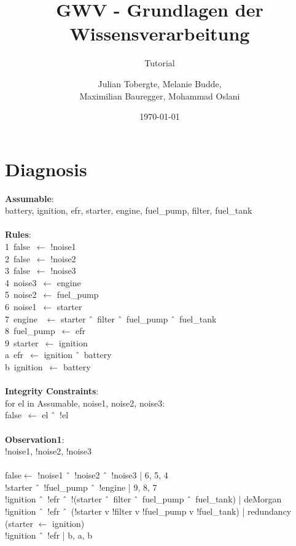 \documentclass[DIV=9,numbers=noenddot]{scrartcl}
\title{GWV - Grundlagen der Wissensverarbeitung}
\subtitle{Tutorial \arabic{blatt}}
\author{Julian Tobergte, Melanie Budde,\\Maximilian Bauregger, Mohammad Oslani}
\date{\today}
\begin{document}
	\maketitle
				
	\section{Diagnosis}	
	\textbf{Assumable}:\\
	battery, ignition, efr, starter, engine, fuel\_pump, filter, fuel\_tank\\\\
	\textbf{Rules}:\\
	1\ false\ $\leftarrow$ !noise1\\
	2\ false\ $\leftarrow$ !noise2\\
	3\ false\ $\leftarrow$ !noise3\\
	4\ noise3\ $\leftarrow$ engine\\
	5\ noise2\ $\leftarrow$ fuel\_pump\\
	6\ noise1\ $\leftarrow$ starter\\
	7\ engine \ $\leftarrow$ starter \^\ \ filter \^\ \ fuel\_pump \^\ \  fuel\_tank\\
	8\ fuel\_pump\ $\leftarrow$ efr\\
	9\ starter\ $\leftarrow$ ignition\\
	a\ efr\ $\leftarrow$ ignition \^\ \ battery\\
	b\ ignition\ $\leftarrow$ battery\\\\
    \textbf{Integrity Constraints}:\\
	for el in Assumable, noise1, noise2, noise3:\\
	false\ $\leftarrow$ el \^\ \  !el\\\\
	\textbf{Observation1}:\\
	!noise1, !noise2, !noise3\\\\
	false$\leftarrow$ !noise1 \^\ \  !noise2 \^\ \ !noise3	| 6, 5, 4\\
	!starter \^\ \ !fuel\_pump \^\ \  !engine	| 9, 8, 7\\
	!ignition \^\ \  !efr \^\ \  !(starter \^\ \ filter \^\ \  fuel\_pump \^\ \ fuel\_tank) | deMorgan\\
	!ignition \^\ \ !efr \^\ \  (!starter v !filter v !fuel\_pump v !fuel\_tank) | redundancy (starter $\leftarrow$ ignition)\\
	!ignition \^\ \ !efr 	| b, a, b\\
\end{document}
